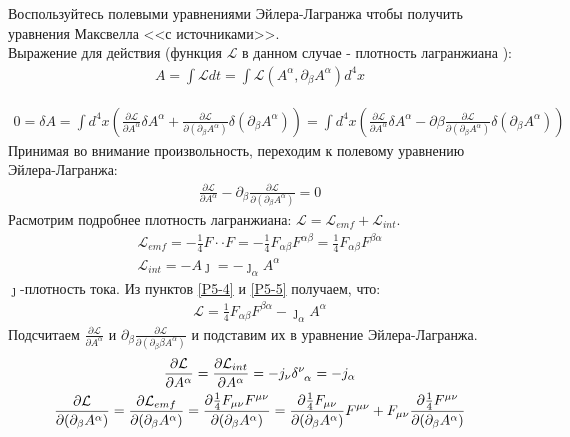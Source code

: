 \documentclass[__main__.tex]{subfiles}
\begin{document}
Воспользуйтесь полевыми уравнениями Эйлера-Лагранжа чтобы получить уравнения Максвелла <<с источниками>>.\\

Выражение для действия (функция $\mathcal{L}$ в данном случае - плотность лагранжиана ):
\begin{gather}
    \label{P5-1}
    A=\int \mathcal{L}dt=\int \mathcal{L}( A^{\alpha},\partial_\beta  A^{\alpha})d^4x
\end{gather}

\begin{gather}
    \label{P5-2}
    0=\delta A=
    \int d^4x\left(
    \frac{\partial \mathcal{L}}{\partial A^\alpha}\delta A^\alpha+\frac{\partial  \mathcal{L}}{\partial(\partial_\beta A^\alpha)}\delta(\partial_\beta A^\alpha)\right)=
    \int d^4x(\frac{\partial \mathcal{L}}{\partial  A^\alpha}\delta A^\alpha-\partial\beta\frac{\partial  \mathcal{L}}{\partial(\partial_\beta A^\alpha)}\delta(\partial_\beta A^\alpha))
\end{gather}
Принимая во внимание произвольность, переходим к полевому уравнению Эйлера-Лагранжа: \\
\begin{gather}
    \label{P5-3}
    \frac{\partial \mathcal{L}}{\partial  A^\alpha}-\partial_\beta\frac{\partial  \mathcal{L}}{\partial(\partial_\beta A^\alpha)}=0
\end{gather}
Расмотрим подробнее плотность лагранжиана: $ \mathcal{L} = \mathcal{L}_{emf}+ \mathcal{L}_{int}.$\\
\begin{gather}
    \label{P5-4}
    \mathcal{L}_{emf}=-\frac{1}{4}F\cdot\cdot F=-\frac{1}{4}F_{\alpha\beta}F^{\alpha\beta}=\frac{1}{4}F_{\alpha\beta}F^{\beta\alpha}\\
    \label{P5-5}
    \mathcal{L}_{int}=- A\jmath=-\jmath_\alpha A^\alpha
\end{gather}
$\jmath$-плотность тока. Из пунктов \ref{P5-4} и \ref{P5-5} получаем, что:
\begin{gather}
    \label{P5-6}
    \mathcal{L}=\frac{1}{4}F_{\alpha\beta}F^{\beta\alpha}-\jmath_\alpha A^\alpha
\end{gather}
Подсчитаем $\frac{\partial \mathcal{L}}{\partial  A^\alpha}$ и $\partial_\beta\frac{\partial  \mathcal{L}}{\partial(\partial_\beta\beta A^\alpha)}$ и подставим их в уравнение Эйлера-Лагранжа.
\begin{gather}
    \label{P5-7}
    \frac{\partial \mathcal{L}}{\partial A^\alpha}=
    \frac{\partial \mathcal{L}_{int}}{\partial  A^\alpha}=
    -j_\nu\delta\indices{^\nu_\alpha} = -j_\alpha\\
    \label{P5-8}
    \frac{\partial\mathcal{L}}{\partial(\partial_\beta A^\alpha)}=\frac{\partial  \mathcal{L}_{emf}}{\partial(\partial_\beta A^\alpha)}=
    \frac{\partial\frac{1}{4}F_{\mu\nu}F^{\mu\nu}}{\partial(\partial_\beta A^\alpha)} =
    \frac{\partial\frac{1}{4}F_{\mu\nu}}{\partial(\partial_\beta A^\alpha)}F^{\mu\nu}+F_{\mu\nu}\frac{\partial\frac{1}{4}F^{\mu\nu}}{\partial(\partial_\beta A^\alpha)}
\end{gather}
\end{document}
